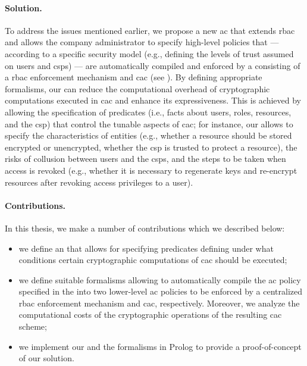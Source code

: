 \paragraph{Solution.} To address the issues mentioned earlier, we propose a new \gls{ac} \erbacwhat that extends \gls{rbac} and allows the company administrator to specify high-level policies that --- according to a specific security model (e.g., defining the levels of trust assumed on users and \glspl{csp}) --- are automatically compiled and enforced by a \hybrid consisting of a \atrcentralized \gls{rbac} enforcement mechanism and \gls{cac} (see ). By defining appropriate formalisms, our \erbac can reduce the computational overhead of cryptographic computations executed in \gls{cac} and enhance its expressiveness. This is achieved by allowing the specification of predicates (i.e., facts about users, roles, resources, and the \gls{csp}) that control the tunable aspects of \gls{cac}; for instance, our \erbac allows to specify the characteristics of entities (e.g., whether a resource should be stored encrypted or unencrypted, whether the \gls{csp} is trusted to protect a resource), the risks of collusion between users and the \glspl{csp}, and the steps to be taken when access is revoked (e.g., whether it is necessary to regenerate keys and re-encrypt resources after revoking access privileges to a user).


\paragraph{Contributions.} In this thesis, we make a number of contributions which we described below:
\begin{itemize}
	
	\item we define an \erbac that allows for specifying predicates defining under what conditions certain cryptographic computations of \gls{cac} should be executed;
	
	\item we define suitable formalisms allowing to automatically compile the \gls{ac} policy specified in the \erbac into two lower-level \gls{ac} policies to be enforced by a centralized \gls{rbac} enforcement mechanism and \gls{cac}, respectively. Moreover, we analyze the computational costs of the cryptographic operations of the resulting \gls{cac} scheme;
	
	\item we implement our \erbac and the formalisms in Prolog to provide a proof-of-concept of our solution.
	
\end{itemize}

